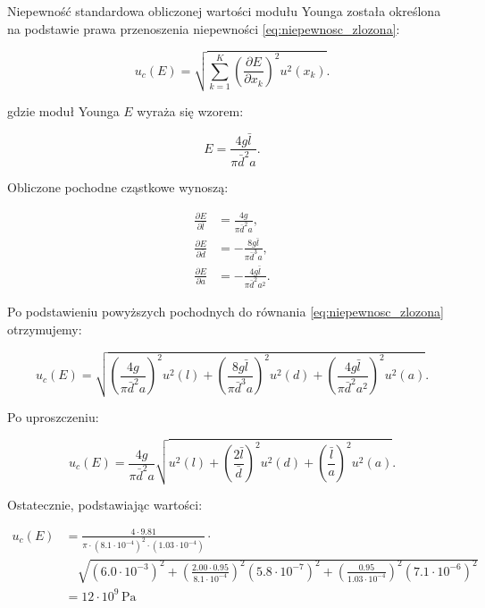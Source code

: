 \documentclass[a4paper,12pt]{article}
\begin{document}
Niepewność standardowa obliczonej wartości modułu Younga została określona na podstawie prawa przenoszenia niepewności \eqref{eq:niepewnosc_zlozona}:

\begin{equation}
\label{eq:niepewnosc_zlozona}
    u_c(E) = \sqrt{\sum_{k=1}^{K} \left( \frac{\partial E}{\partial x_k} \right)^2 u^2(x_k)}.
\end{equation}

gdzie moduł Younga \( E \) wyraża się wzorem:

\begin{equation*}
E = \frac{4g\bar{l}}{\pi\bar{d}^2 a}.
\end{equation*}

Obliczone pochodne cząstkowe wynoszą:

\begin{align*}
    \frac{\partial E}{\partial \bar{l}} &= \frac{4g}{\pi \bar{d}^2 a}, \\
    \frac{\partial E}{\partial \bar{d}} &= -\frac{8g\bar{l}}{\pi \bar{d}^3 a}, \\
    \frac{\partial E}{\partial a} &= -\frac{4g\bar{l}}{\pi \bar{d}^2 a^2}.
\end{align*}

Po podstawieniu powyższych pochodnych do równania \eqref{eq:niepewnosc_zlozona} otrzymujemy:

\begin{equation*}
u_c(E) = \sqrt{\left( \frac{4g}{\pi \bar{d}^2 a} \right)^2 u^2(l) 
+ \left( \frac{8g\bar{l}}{\pi \bar{d}^3 a} \right)^2 u^2(d) 
+ \left( \frac{4g\bar{l}}{\pi \bar{d}^2 a^2} \right)^2 u^2(a)}.
\end{equation*}

Po uproszczeniu:

\begin{equation*}
u_c(E) = \frac{4g}{\pi \bar{d}^2 a} 
\sqrt{ u^2(l) + \left( \frac{2\bar{l}}{\bar{d}} \right)^2 u^2(d) + \left( \frac{\bar{l}}{a} \right)^2 u^2(a) }.
\end{equation*}

Ostatecznie, podstawiając wartości: 

\begin{align*}
u_c(E) &= \frac{4 \cdot 9.81}{\pi \cdot (8.1 \cdot 10^{-4})^2 \cdot (1.03 \cdot 10^{-4})} \cdot 
\\
&\quad \sqrt{ (6.0 \cdot 10^{-3})^2 + \left( \frac{2.00 \cdot 0.95}{8.1 \cdot 10^{-4}} \right)^2 (5.8 \cdot 10^{-7})^2 + \left( \frac{0.95}{1.03 \cdot 10^{-4}} \right)^2 (7.1 \cdot 10^{-6})^2 } 
\\
&= 12 \cdot 10^9\,\text{Pa}
\end{align*}
\end{document}
